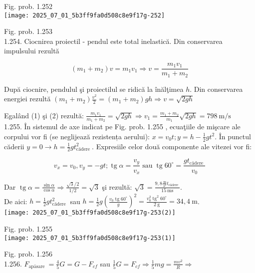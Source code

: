 Fig. prob. 1.252\\
\texttt{[image: 2025\_07\_01\_5b3ff9fa0d508c8e9f17g-252]}

Fig. prob. 1.253\\
1.254. Ciocnirea proiectil - pendul este total inelastică. Din conservarea impulsului rezultă


\begin{equation*}
\left(m_{1}+m_{2}\right) v=m_{1} v_{1} \Rightarrow v=\frac{m_{1} v_{1}}{m_{1}+m_{2}} \tag{1}
\end{equation*}

După ciocnire, pendulul şi proiectilul se ridică la înălţimea $h$. Din conservarea energiei rezultă $\left(m_{1}+m_{2}\right) \frac{v^{2}}{2}=\left(m_{1}+m_{2}\right) g h \Rightarrow v=\sqrt{2 g h}$

Egalând (1) şi (2) rezultă: $\frac{m_{1} v_{1}}{m_{1}+m_{2}}=\sqrt{2 g h} \Rightarrow v_{1}=\frac{m_{1}+m_{2}}{m_{1}} \sqrt{2 g h}=798 \mathrm{~m} / \mathrm{s}$\\
1.255. În sistemul de axe indicat pe Fig. prob. 1.255 , ecuaţiile de mişcare ale corpului vor fi (se neglijează rezistența aerului): $x=v_{0} t ; y=h-\frac{1}{2} g t^{2}$. În punctul căderii $y=0 \rightarrow h=\frac{1}{2} g t_{\text {cădere }}^{2}$. Expresiile celor două componente ale vitezei vor fi:

$$
v_{x}=v_{0}, v_{y}=-g t ; \operatorname{tg} \alpha=\frac{v_{y}}{v_{x}} \operatorname{sau} \operatorname{tg} 60^{\circ}=\frac{g t_{\text {cădere }}}{v_{0}}
$$

Dar $\operatorname{tg} \alpha=\frac{\sin \alpha}{\cos \alpha} \Rightarrow \frac{\sqrt{3} / 2}{1 / 2}=\sqrt{3}$ şi rezultă: $\sqrt{3}=\frac{9,8 \frac{\mathrm{~m}}{\mathrm{~s}^{2}} t_{\text {cădere }}}{15 \mathrm{~ms}}$.\\
De aici: $h=\frac{1}{2} g t_{\text {cădere }}^{2}$ sau $h=\frac{1}{2} g\left(\frac{v_{0} \operatorname{tg} 60^{\circ}}{g}\right)^{2}=\frac{v_{0}^{2} \operatorname{tg}^{2} 60^{\circ}}{2 \mathrm{~g}}=34,4 \mathrm{~m}$.\\
\texttt{[image: 2025\_07\_01\_5b3ff9fa0d508c8e9f17g-253(2)]}

Fig. prob. 1.255\\
\texttt{[image: 2025\_07\_01\_5b3ff9fa0d508c8e9f17g-253(1)]}

Fig. prob. 1.256\\
1.256. $F_{\text {apäsare }}=\frac{4}{5} G=G-F_{c f}$ sau $\frac{1}{5} G=F_{c f} \Rightarrow \frac{1}{5} m g=\frac{m v^{2}}{R} \Rightarrow$

